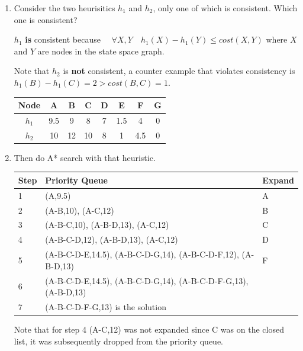 \documentclass[11pt]{article}
\begin{document}
   \begin{enumerate}
  
   \item Consider the two heurisitics $h_1$ and $h_2$, only one of
     which is consistent.  Which one is consistent?

     $h_1$ \textbf{is} consistent because $\quad \forall{X,Y} \quad h_1(X)-h_1(Y) \le cost(X,Y)$ where $X$ and $Y$ are nodes in the state space graph.

     Note that $h_2$ is \textbf{not} consistent, a counter example that violates consistency is $h_1(B)-h_1(C) = 2 > cost(B,C) = 1$.



\begin{center}
\begin{tabular}{|c|c|c|c|c|c|c|c|}\hline
Node  & A   & B  & C  & D  & E   & F   & G  \\ \hline
$h_1$ & 9.5 & 9	 & 8  & 7  & 1.5 & 4   & 0  \\ \hline
$h_2$ & 10  & 12 & 10 & 8  & 1   & 4.5 & 0  \\ \hline
\end{tabular}
\end{center}

  \item Then do A* search with that heuristic.

    \begin{center}
    \begin{tabular}{|l|l@{\hspace*{1in}}|l|} \hline
    \bf Step & \bf Priority Queue & \bf Expand \\ \hline
    1 & (A,9.5) & A \\ \hline
    2 & (A-B,10), (A-C,12) & B \\ \hline
    3 & (A-B-C,10), (A-B-D,13), (A-C,12) & C \\ \hline
    4 & (A-B-C-D,12), (A-B-D,13), (A-C,12) & D \\ \hline
    5 & (A-B-C-D-E,14.5), (A-B-C-D-G,14), (A-B-C-D-F,12), (A-B-D,13) & F \\ \hline
    6 & (A-B-C-D-E,14.5), (A-B-C-D-G,14), (A-B-C-D-F-G,13), (A-B-D,13) &  \\ \hline
    7 & (A-B-C-D-F-G,13) is the solution &  \\ \hline
    \end{tabular}
    \end{center}

    Note that for step 4 (A-C,12) was not expanded since C was on the closed list, it was subsequently dropped from the priority queue.


\end{enumerate}
\end{document}
